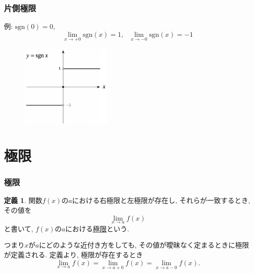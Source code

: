 \documentclass[dvipdfmx,cjk,10.2pt]{beamer}
\theoremstyle{definition}
\newtheorem{Def}[Thm]{定義}
\begin{document}
\begin{frame}
\frametitle{片側極限}


例: $\mathrm{sgn}(0)=0$, 
$$
\lim_{x \to +0}\mathrm{sgn}(x)=1, \ \ \ \lim_{x \to -0}\mathrm{sgn}(x)=-1
$$

\vspace{-3mm}

 \begin{figure}[htbp]
 \begin{center} 
  \includegraphics[width=45mm]{sgn.png}
 \end{center}
\end{figure}

\vspace{-3mm}

\end{frame}





\section{極限}

\begin{frame}
\frametitle{極限} 


\begin{Def}
関数$f(x)$の$a$における右極限と左極限が存在し, それらが一致するとき, その値を
$$
\lim_{x\to a} f(x)
$$
と書いて, $f(x)$の$a$における\underline{極限}という. 
\end{Def}

つまり$x$が$a$にどのような近付き方をしても, その値が曖昧なく定まるときに極限が定義される. 
定義より, 極限が存在するとき
$$
\lim_{x\to a} f(x) = \lim_{x\to a+0} f(x) = \lim_{x\to a-0} f(x). 
$$

\end{frame}


\end{document}

